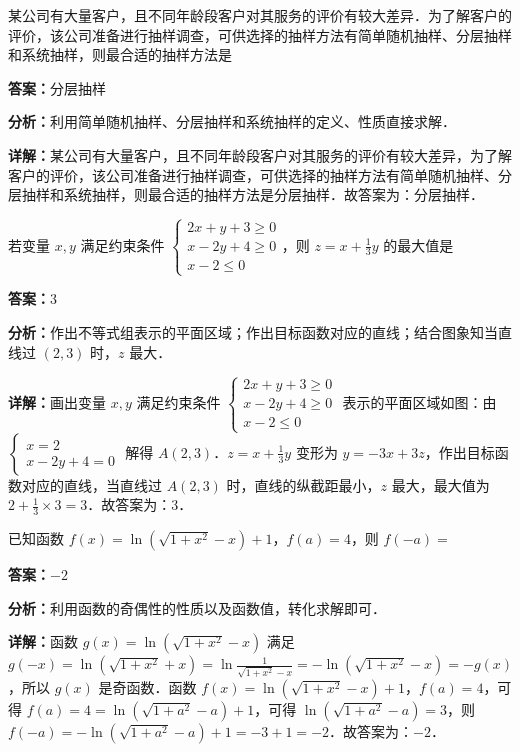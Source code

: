 \begin{question}[points=5]
某公司有大量客户，且不同年龄段客户对其服务的评价有较大差异．为了解客户的评价，该公司准备进行抽样调查，可供选择的抽样方法有简单随机抽样、分层抽样和系统抽样，则最合适的抽样方法是
\fillin[{$分层抽样$}]
\begin{solution}
\textbf{答案：}$分层抽样$

\textbf{分析：}利用简单随机抽样、分层抽样和系统抽样的定义、性质直接求解．

\textbf{详解：}某公司有大量客户，且不同年龄段客户对其服务的评价有较大差异，为了解客户的评价，该公司准备进行抽样调查，可供选择的抽样方法有简单随机抽样、分层抽样和系统抽样，则最合适的抽样方法是分层抽样．故答案为：分层抽样．
\end{solution}
\end{question}

\begin{question}[points=5]
若变量 $x,y$ 满足约束条件 $\begin{cases} 2x+y+3\ge 0 \\ x-2y+4\ge 0 \\ x-2\le 0 \end{cases}$，则 $z=x+\frac{1}{3}y$ 的最大值是
\fillin[{$3$}]
\begin{solution}
\textbf{答案：}$3$

\textbf{分析：}作出不等式组表示的平面区域；作出目标函数对应的直线；结合图象知当直线过 $(2,3)$ 时，$z$ 最大．

\textbf{详解：}画出变量 $x,y$ 满足约束条件 $\begin{cases} 2x+y+3\ge 0 \\ x-2y+4\ge 0 \\ x-2\le 0 \end{cases}$ 表示的平面区域如图：由 $\begin{cases} x=2 \\ x-2y+4=0 \end{cases}$ 解得 $A(2,3)$．$z=x+\frac{1}{3}y$ 变形为 $y=-3x+3z$，作出目标函数对应的直线，当直线过 $A(2,3)$ 时，直线的纵截距最小，$z$ 最大，最大值为 $2+\frac{1}{3}\times 3=3$．故答案为：$3$．
\end{solution}
\end{question}

\begin{question}[points=5]
已知函数 $f(x)=\ln(\sqrt{1+x^2}-x)+1$，$f(a)=4$，则 $f(-a)=$
\fillin[{$-2$}]
\begin{solution}
\textbf{答案：}$-2$

\textbf{分析：}利用函数的奇偶性的性质以及函数值，转化求解即可．

\textbf{详解：}函数 $g(x)=\ln(\sqrt{1+x^2}-x)$ 满足 $g(-x)=\ln(\sqrt{1+x^2}+x)=\ln\frac{1}{\sqrt{1+x^2}-x}=-\ln(\sqrt{1+x^2}-x)=-g(x)$，所以 $g(x)$ 是奇函数．函数 $f(x)=\ln(\sqrt{1+x^2}-x)+1$，$f(a)=4$，可得 $f(a)=4=\ln(\sqrt{1+a^2}-a)+1$，可得 $\ln(\sqrt{1+a^2}-a)=3$，则 $f(-a)=-\ln(\sqrt{1+a^2}-a)+1=-3+1=-2$．故答案为：$-2$．
\end{solution}
\end{question}

